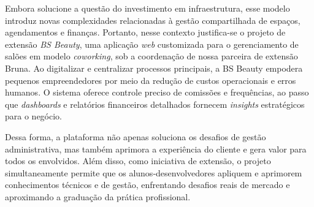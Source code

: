 \FloatBarrier

Embora solucione a questão do investimento em infraestrutura, esse modelo introduz novas complexidades relacionadas à gestão compartilhada de espaços, agendamentos e finanças. Portanto, nesse contexto justifica-se o projeto de extensão \emph{BS Beauty}, uma aplicação \emph{web} customizada para o gerenciamento de salões em modelo \emph{coworking}, sob a coordenação de nossa parceira de extensão Bruna. Ao digitalizar e centralizar processos principais, a BS Beauty empodera pequenos empreendedores por meio da redução de custos operacionais e erros humanos. O sistema oferece controle preciso de comissões e frequências, ao passo que \emph{dashboards} e relatórios financeiros detalhados fornecem \emph{insights} estratégicos para o negócio. 

Dessa forma, a plataforma não apenas soluciona os desafios de gestão administrativa, mas também aprimora a experiência do cliente e gera valor para todos os envolvidos. Além disso, como iniciativa de extensão, o projeto simultaneamente permite que os alunos‐desenvolvedores apliquem e aprimorem conhecimentos técnicos e de gestão, enfrentando desafios reais de mercado e aproximando a graduação da prática profissional.


